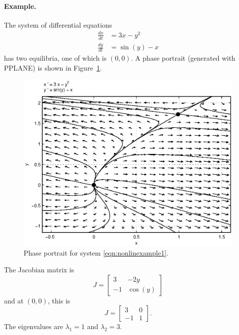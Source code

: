 \documentclass[reqno]{immbook}
\begin{document}
\paragraph{Example.}
The system of differential equations
\begin{equation}
\begin{split}
   \frac{dx}{dt} & = 3x-y^2 \\
   \frac{dy}{dt} & = \sin(y)-x
\end{split}
\label{eqn:nonlinexample1}
\end{equation}
has two equilibria, one of which is  $(0,0)$.
A phase portrait (generated with PPLANE) is shown in
Figure~\ref{fig:nonlinexample1}.
\begin{figure}
\centerline{%
\includegraphics[width=5in]{pplane_plots/NonlinExample1.ps}
}
\caption{Phase portrait for system \eqref{eqn:nonlinexample1}.}
\label{fig:nonlinexample1}
\end{figure}
  The Jacobian matrix is
\begin{equation}
  J = \begin{bmatrix}
           3 &  -2y \\
	   -1 & \cos(y)
      \end{bmatrix}
\end{equation}
and at $(0,0)$, this is
\begin{equation}
  J = \begin{bmatrix}
           3 &  0 \\
	   -1 & 1
      \end{bmatrix}.
\end{equation}
The eigenvalues are $\lambda_1=1$ and $\lambda_2=3$.
\end{document}
